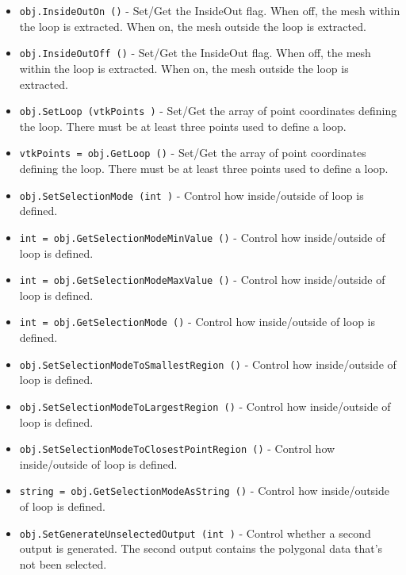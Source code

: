 \begin{itemize}
\item  \verb|obj.InsideOutOn ()| -  Set/Get the InsideOut flag. When off, the mesh within the loop is
 extracted. When on, the mesh outside the loop is extracted.

\item  \verb|obj.InsideOutOff ()| -  Set/Get the InsideOut flag. When off, the mesh within the loop is
 extracted. When on, the mesh outside the loop is extracted.

\item  \verb|obj.SetLoop (vtkPoints )| -  Set/Get the array of point coordinates defining the loop. There must
 be at least three points used to define a loop.

\item  \verb|vtkPoints = obj.GetLoop ()| -  Set/Get the array of point coordinates defining the loop. There must
 be at least three points used to define a loop.

\item  \verb|obj.SetSelectionMode (int )| -  Control how inside/outside of loop is defined.

\item  \verb|int = obj.GetSelectionModeMinValue ()| -  Control how inside/outside of loop is defined.

\item  \verb|int = obj.GetSelectionModeMaxValue ()| -  Control how inside/outside of loop is defined.

\item  \verb|int = obj.GetSelectionMode ()| -  Control how inside/outside of loop is defined.

\item  \verb|obj.SetSelectionModeToSmallestRegion ()| -  Control how inside/outside of loop is defined.

\item  \verb|obj.SetSelectionModeToLargestRegion ()| -  Control how inside/outside of loop is defined.

\item  \verb|obj.SetSelectionModeToClosestPointRegion ()| -  Control how inside/outside of loop is defined.

\item  \verb|string = obj.GetSelectionModeAsString ()| -  Control how inside/outside of loop is defined.

\item  \verb|obj.SetGenerateUnselectedOutput (int )| -  Control whether a second output is generated. The second output
 contains the polygonal data that's not been selected.


\end{itemize}
